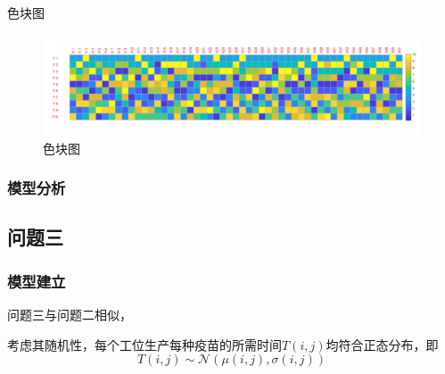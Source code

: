 \documentclass[UTF8]{ctexart}
\begin{document}
\begin{enumerate}
	色块图
		\begin{figure}[H]
			\centering %
			\includegraphics[scale=0.5]{2_sekuai.jpg}
			\caption{色块图}
		\end{figure}
	\end{enumerate}
	
	\subsubsection{模型分析}
	
	\subsection{问题三}
	\subsubsection{模型建立}
	问题三与问题二相似，
	
	考虑其随机性，每个工位生产每种疫苗的所需时间$T(i,j)$均符合正态分布，即
	\begin{equation}
	T(i,j)\sim\mathcal{N}(\mu(i,j),\sigma(i,j))
	\end{equation}
	
\end{document}
